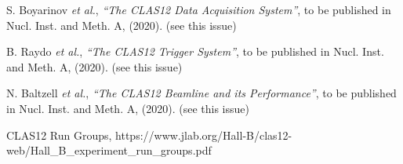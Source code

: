 \documentclass[final,3p,twocolumn]{elsarticle}
\begin{document}
\begin{thebibliography}{99}
S. Boyarinov {\it et al.}, {\it ``The CLAS12 Data Acquisition System''}, to be published in Nucl. Inst.
and Meth. A, (2020). (see this issue)

B. Raydo {\it et al.}, {\it ``The CLAS12 Trigger System''}, to be published in Nucl. Inst. and Meth. A, (2020).
(see this issue)

N. Baltzell {\it et al.}, {\it ``The CLAS12 Beamline and its Performance''}, to be published in Nucl. Inst.
and Meth. A, (2020). (see this issue)

CLAS12 Run Groups, https://www.jlab.org/Hall-B/clas12-web/Hall\_B\_experiment\_run\_groups.pdf


\end{thebibliography}

\end{document}
